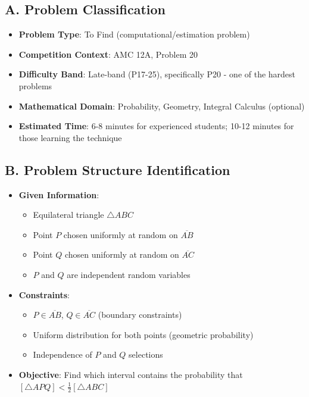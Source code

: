 \documentclass[11pt]{article}
\begin{document}
\begin{problemconfigbox}
\subsection*{A. Problem Classification}
\begin{itemize}[leftmargin=*]
    \item \textbf{Problem Type}: To Find (computational/estimation problem)
    \item \textbf{Competition Context}: AMC 12A, Problem 20
    \item \textbf{Difficulty Band}: Late-band (P17-25), specifically P20 - one of the hardest problems
    \item \textbf{Mathematical Domain}: Probability, Geometry, Integral Calculus (optional)
    \item \textbf{Estimated Time}: 6-8 minutes for experienced students; 10-12 minutes for those learning the technique
\end{itemize}

\subsection*{B. Problem Structure Identification}
\begin{itemize}[leftmargin=*]
    \item \textbf{Given Information}: 
    \begin{itemize}
        \item Equilateral triangle $\triangle ABC$
        \item Point $P$ chosen uniformly at random on $\overline{AB}$
        \item Point $Q$ chosen uniformly at random on $\overline{AC}$
        \item $P$ and $Q$ are independent random variables
    \end{itemize}
    
    \item \textbf{Constraints}: 
    \begin{itemize}
        \item $P \in \overline{AB}$, $Q \in \overline{AC}$ (boundary constraints)
        \item Uniform distribution for both points (geometric probability)
        \item Independence of $P$ and $Q$ selections
    \end{itemize}
    
    \item \textbf{Objective}: Find which interval contains the probability that $[\triangle APQ] < \frac{1}{2}[\triangle ABC]$
    

\end{itemize}
\end{problemconfigbox}
\end{document}
